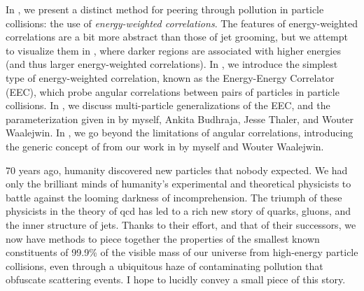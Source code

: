 In , we present a distinct method for peering through pollution in particle collisions:
%
the use of \textit{energy-weighted correlations}.
%
The features of energy-weighted correlations are a bit more abstract than those of jet grooming, but we attempt to visualize them in , where darker regions are associated with higher energies (and thus larger energy-weighted correlations).
%
In , we introduce the simplest type of energy-weighted correlation, known as the Energy-Energy Correlator (EEC), which probe angular correlations between pairs of particles in particle collisions.
%
In , we discuss multi-particle generalizations of the EEC, and the parameterization given in  by myself, Ankita Budhraja, Jesse Thaler, and Wouter Waalejwin.
%
In , we go beyond the limitations of angular correlations, introducing the generic concept of  from our work in  by myself and Wouter Waalejwin.


70 years ago, humanity discovered new particles that nobody expected.
%
We had only the brilliant minds of humanity's experimental and theoretical physicists to battle against the looming darkness of incomprehension.
%
The triumph of these physicists in the theory of \gls{qcd} has led to a rich new story of quarks, gluons, and the inner structure of jets.
%
Thanks to their effort, and that of their successors, we now have methods to piece together the properties of the smallest known constituents of 99.9\% of the visible mass of our universe from high-energy particle collisions, even through a ubiquitous haze of contaminating pollution that obfuscate scattering events.
%
I hope to lucidly convey a small piece of this story.
